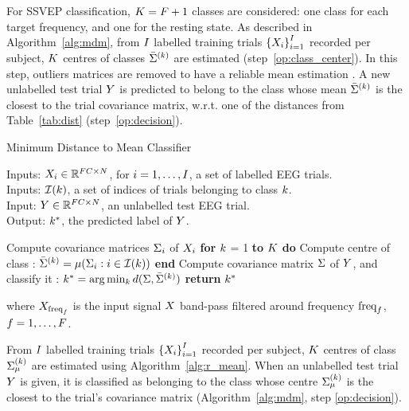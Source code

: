 For SSVEP classification, $\dK = \dF + 1$ classes are considered: one class for each target frequency, and one for the resting state.
As described in Algorithm~\ref{alg:mdm}, from $\dT$ labelled training trials $ \left\{ \X_{\ti} \right\}_{\ti=1}^{\dT}$ recorded per subject, $\dK$ centres of classes $\Pm^{(\ci)}$ are estimated (step~\ref{op:class_center}). 
In this step, outliers matrices are removed to have a reliable mean estimation \citep{barachant_riemannian_2013}.
A new unlabelled test trial $\Y$ is predicted to belong to the class whose mean $\Pm^{(\ci)}$ is the closest to the trial covariance matrix, w.r.t. one of the distances from Table~\ref{tab:dist} (step~\ref{op:decision}).

\begin{algorithm}
\caption{Minimum Distance to Mean Classifier}
\label{alg:mdm}
	Inputs: $\X_{\ti} \in \Re^{\dF \dc\times\dt}$, for $\ti = 1, \ldots, \dT$, a set of labelled EEG trials. \\
	Inputs: $\setindex(\ci)$, a set of indices of trials belonging to class $\ci$. \\
	Input: $\Y \in \Re^{\dF \dc\times\dt}$, an unlabelled test EEG trial. \\
	Output: $\clout$, the predicted label of $\Y$.
	\begin{algorithmic}[1]
	\State Compute covariance matrices $\P_{\ti}$ of $\X_\ti$ 
	\State \textbf{for} $\ci$ = 1 \textbf{to} $\dK$ \textbf{do}
	\State \quad Compute centre of class : $\Pm^{(\ci)}=\Rm(\P_{\ti}:\ti \in \setindex(\ci))$
	\label{op:class_center}
	\State \textbf{end}
	\State Compute covariance matrix $\P$ of $\Y$, and classify it : $\clout = \arg \min_{\ci} \dist(\P, \Pm^{(\ci)})$
	\label{op:decision}
	\State \textbf{return} $\clout$
	\end{algorithmic}
\end{algorithm}

where $X_{\text{freq}_\df}$ is the input signal $\X$ band-pass filtered around frequency $\text{freq}_\df$, $\df=1, \ldots, \dF$. 

From $\dT$ labelled training trials $ \left\{ \X_{\ti} \right\}_{\ti=1}^{\dT}$ recorded per subject, $\dK$ centres of class $\P_{\Rm}^{(\ci)}$ are estimated using Algorithm~\ref{alg:r_mean}. 
When an unlabelled test trial $\Y$ is given, it is classified as belonging to the class whose centre $\P_{\Rm}^{(\ci)}$ is the closest to the trial's covariance matrix (Algorithm~\ref{alg:mdm}, step \ref{op:decision}).
   
